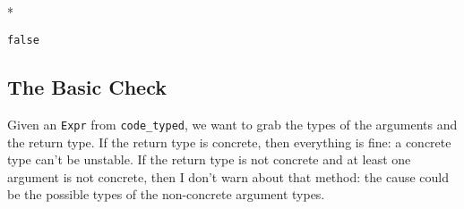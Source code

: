 \documentclass[letterpaper,10pt,english]{/Users/danluu/anaconda/lib/python2.7/site-packages/sphinx/texinputs/sphinxhowto}
\def\smaller{\fontsize{9.5pt}{9.5pt}\selectfont}
\newenvironment{InvisibleVerbatim}
        {\begin{mdframed}[leftmargin=0.1\linewidth,innerleftmargin=3pt,innerrightmargin=3pt, userdefinedwidth=1\linewidth, linewidth=0pt, linecolor=white, usetwoside=false]}
        {\end{mdframed}}
\begin{document}
                \makebox[0.1\linewidth]{\smaller\hfill\tt\color{nbframe-out-prompt}Out\hspace{4pt}{[}22{]}:\hspace{4pt}}\\*
                \vspace{-2.55\baselineskip}\begin{InvisibleVerbatim}
                \vspace{-0.5\baselineskip}
\begin{alltt}false\end{alltt}

            \end{InvisibleVerbatim}
            
        
    
\subsection{The Basic Check}Given an \texttt{Expr} from \texttt{code\_typed}, we want to grab the
types of the arguments and the return type. If the return type is
concrete, then everything is fine: a concrete type can't be unstable. If
the return type is not concrete and at least one argument is not
concrete, then I don't warn about that method: the cause could be the
possible types of the non-concrete argument types.

\end{document}
